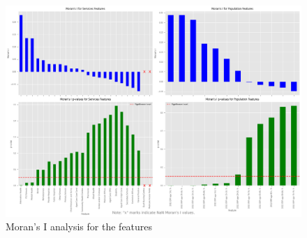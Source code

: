 \documentclass[
	a4paper, %
	10pt, %
	unnumberedsections, %
	twoside, %
]{LTJournalArticle}
\begin{document}
\begin{figure}
  \includegraphics[scale=0.5]{moran_i_analysis.png}
  \caption{Moran's I analysis for the features}
  \label{fig:moran_part_A}
\end{figure}



\pagebreak
\clearpage





\printbibliography
\end{document}
